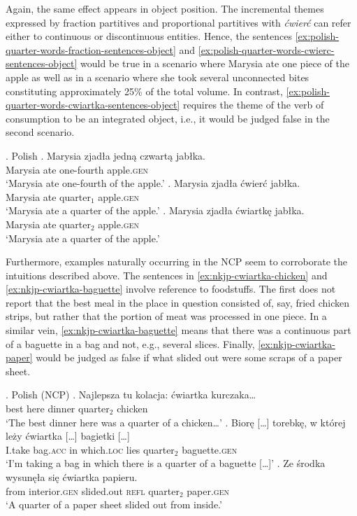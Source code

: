Again, the same effect appears in object position. The incremental themes expressed by fraction partitives and proportional partitives with \textit{ćwierć} can refer either to continuous or discontinuous entities. Hence, the sentences \ref{ex:polish-quarter-words-fraction-sentences-object} and \ref{ex:polish-quarter-words-cwierc-sentences-object} would be true in a scenario where Marysia ate one piece of the apple as well as in a scenario where she took several unconnected bites constituting approximately 25\% of the total volume. In contrast, \ref{ex:polish-quarter-words-cwiartka-sentences-object} requires the theme of the verb of consumption to be an integrated object, i.e., it would be judged false in the second scenario.

\ex. Polish\label{ex:polish-quarter-words-sentences-object}
\ag. Marysia zjadła {jedną czwartą} jabłka.\label{ex:polish-quarter-words-fraction-sentences-object}\\
Marysia ate one-fourth apple\textsc{.gen}\\
`Marysia ate one-fourth of the apple.'
\bg. Marysia zjadła ćwierć jabłka.\label{ex:polish-quarter-words-cwierc-sentences-object}\\
Marysia ate quarter$_1$ apple\textsc{.gen}\\
`Marysia ate a quarter of the apple.'
\bg. Marysia zjadła ćwiartkę jabłka.\label{ex:polish-quarter-words-cwiartka-sentences-object}\\
Marysia ate quarter$_2$ apple\textsc{.gen}\\
`Marysia ate a quarter of the apple.'

Furthermore, examples naturally occurring in the NCP seem to corroborate the intuitions described above. The sentences in \ref{ex:nkjp-cwiartka-chicken} and \ref{ex:nkjp-cwiartka-baguette} involve reference to foodstuffs. The first does not report that the best meal in the place in question consisted of, say, fried chicken strips, but rather that the portion of meat was processed in one piece. In a similar vein, \ref{ex:nkjp-cwiartka-baguette} means that there was a continuous part of a baguette in a bag and not, e.g., several slices. Finally, \ref{ex:nkjp-cwiartka-paper} would be judged as false if what slided out were some scraps of a paper sheet.

\ex.\label{ex:nkjp-cwiartka} Polish (NCP)
\ag. Najlepsza tu kolacja: ćwiartka kurczaka\dots\label{ex:nkjp-cwiartka-chicken}\\
best here dinner quarter$_2$ chicken\\
`The best dinner here was a quarter of a chicken\dots'
\bg. {Biorę [\dots]} torebkę, w której leży {ćwiartka [\dots]} {bagietki [\dots]}\label{ex:nkjp-cwiartka-baguette}\\
I.take bag\textsc{.acc} in which\textsc{.loc} lies quarter$_2$ baguette\textsc{.gen}\\
`I'm taking a bag in which there is a quarter of a baguette [\dots]'
\bg. Ze środka wysunęła się ćwiartka papieru.\label{ex:nkjp-cwiartka-paper}\\
from interior\textsc{.gen} slided.out \textsc{refl} quarter$_2$ paper\textsc{.gen}\\
`A quarter of a paper sheet slided out from inside.'

